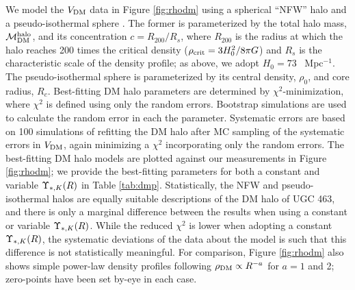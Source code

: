 \documentclass[apj,iop,numberedappendix]{emulateapj}
\begin{document}
We model the $V_{\rm DM}$ data in Figure \ref{fig:rhodm} using a spherical ``NFW''
halo \citep{1996ApJ...462..563N, 1997ApJ...490..493N} and a pseudo-isothermal
sphere \citep{1979IAUS...84..441O, 1985IAUS..106...75S, 1986AJ.....91.1301K}.
The former is parameterized by the total halo mass, $\mathcal{M}^{\rm halo}_{\rm DM}$, and its
concentration $c=R_{200}/R_s$, where $R_{200}$ is the radius at which the halo
reaches 200 times the critical density ($\rho_{\rm crit} = 3 H_0^2/8\pi G$) and
$R_s$ is the characteristic scale of the density profile; as above, we adopt
$H_0 = 73$ \kms~Mpc$^{-1}$.  The pseudo-isothermal sphere is parameterized by
its central density, $\rho_0$, and core radius, $R_c$.  Best-fitting DM halo
parameters are determined by $\chi^2$-minimization, where $\chi^2$ is defined
using only the random errors.  Bootstrap simulations are used to calculate the
random error in each the parameter.  Systematic errors are based on 100
simulations of refitting the DM halo after MC sampling of the systematic errors
in $V_{\rm DM}$, again minimizing a $\chi^2$ incorporating only the random errors.
The best-fitting DM halo models are plotted against our measurements in Figure
\ref{fig:rhodm}; we provide the best-fitting parameters for both a constant and
variable $\Upsilon_{\ast,K}(R)$ in Table \ref{tab:dmp}.  Statistically, the NFW and
pseudo-isothermal halos are equally suitable descriptions of the DM halo of UGC
463, and there is only a marginal difference between the results when using a
constant or variable $\Upsilon_{\ast,K}(R)$.  While the reduced $\chi^2$ is lower when
adopting a constant $\Upsilon_{\ast,K}(R)$, the systematic deviations of the data about the
model is such that this difference is not statistically meaningful.  For
comparison, Figure \ref{fig:rhodm} also shows simple power-law density profiles
following $\rho_{\rm DM}\propto R^{-a}$ for $a = 1$ and 2; zero-points have been set
by-eye in each case.
\end{document}

